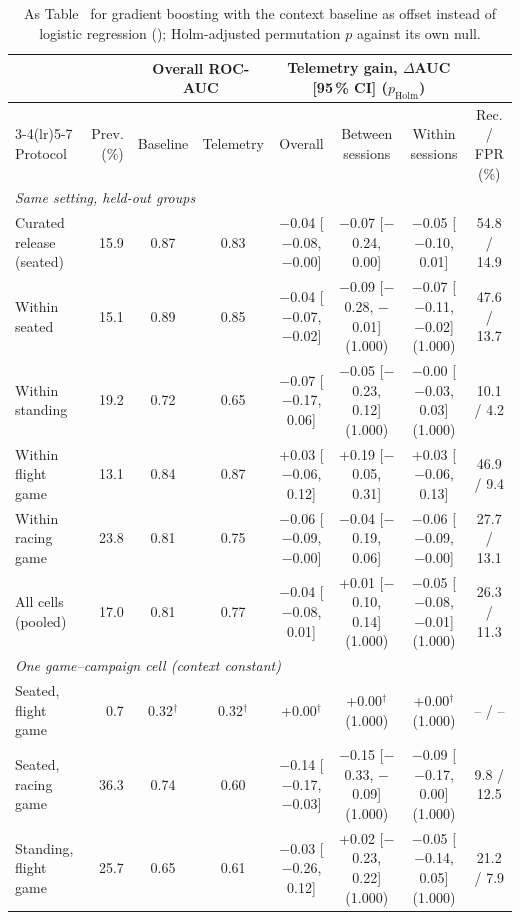 \begin{table}[t]
\centering
\footnotesize
\caption{As Table~ for gradient boosting with the context baseline as offset instead of logistic regression (\sevtwo{}); Holm-adjusted permutation $p$ against its own null.}
\label{tab:supp_gain_xgb}
\setlength{\tabcolsep}{1.5pt}
\begin{tabular}{@{}lrcccccc@{}}
\toprule
 & & \multicolumn{2}{c}{Overall ROC-AUC} & \multicolumn{3}{c}{Telemetry gain, $\Delta$AUC [95\,\% CI] ($p_{\mathrm{Holm}}$)} & \\
\cmidrule(lr){3-4}\cmidrule(lr){5-7}
Protocol & Prev. (\%) & Baseline & Telemetry & Overall & Between sessions & Within sessions & Rec. / FPR (\%) \\
\midrule
\multicolumn{8}{l}{\emph{Same setting, held-out groups}} \\
Curated release (seated) & 15.9 & 0.87 & 0.83 & $-$0.04 [$-$0.08, $-$0.00] & $-$0.07 [$-$0.24, 0.00] & $-$0.05 [$-$0.10, 0.01] & 54.8 / 14.9 \\
Within seated & 15.1 & 0.89 & 0.85 & $-$0.04 [$-$0.07, $-$0.02] & $-$0.09 [$-$0.28, $-$0.01] (1.000) & $-$0.07 [$-$0.11, $-$0.02] (1.000) & 47.6 / 13.7 \\
Within standing & 19.2 & 0.72 & 0.65 & $-$0.07 [$-$0.17, 0.06] & $-$0.05 [$-$0.23, 0.12] (1.000) & $-$0.00 [$-$0.03, 0.03] (1.000) & 10.1 / 4.2 \\
Within flight game & 13.1 & 0.84 & 0.87 & +0.03 [$-$0.06, 0.12] & +0.19 [$-$0.05, 0.31] & +0.03 [$-$0.06, 0.13] & 46.9 / 9.4 \\
Within racing game & 23.8 & 0.81 & 0.75 & $-$0.06 [$-$0.09, $-$0.00] & $-$0.04 [$-$0.19, 0.06] & $-$0.06 [$-$0.09, $-$0.00] & 27.7 / 13.1 \\
All cells (pooled) & 17.0 & 0.81 & 0.77 & $-$0.04 [$-$0.08, 0.01] & +0.01 [$-$0.10, 0.14] (1.000) & $-$0.05 [$-$0.08, $-$0.01] (1.000) & 26.3 / 11.3 \\
\multicolumn{8}{l}{\emph{One game--campaign cell (context constant)}} \\
Seated, flight game & 0.7 & 0.32$^\dagger$ & 0.32$^\dagger$ & +0.00$^\dagger$ & +0.00$^\dagger$ (1.000) & +0.00$^\dagger$ (1.000) & -- / -- \\
Seated, racing game & 36.3 & 0.74 & 0.60 & $-$0.14 [$-$0.17, $-$0.03] & $-$0.15 [$-$0.33, $-$0.09] (1.000) & $-$0.09 [$-$0.17, 0.00] (1.000) & 9.8 / 12.5 \\
Standing, flight game & 25.7 & 0.65 & 0.61 & $-$0.03 [$-$0.26, 0.12] & +0.02 [$-$0.23, 0.22] (1.000) & $-$0.05 [$-$0.14, 0.05] (1.000) & 21.2 / 7.9 \\

\end{tabular}
\end{table}
